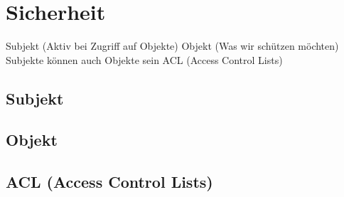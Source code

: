 \section{Sicherheit}

    Subjekt (Aktiv bei Zugriff auf Objekte)
    Objekt (Was wir schützen möchten)
    Subjekte können auch Objekte sein
    ACL (Access Control Lists)    

\subsection{Subjekt}

\subsection{Objekt}

\subsection{ACL (Access Control Lists)}
  

